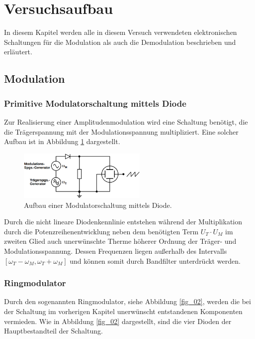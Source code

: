 \section{Versuchsaufbau}
\label{sec:Versuchaufbau}
In diesem Kapitel werden alle in diesem Versuch verwendeten elektronischen Schaltungen für die Modulation als auch die Demodulation beschrieben und erläutert.
\subsection{Modulation}
\subsubsection{Primitive Modulatorschaltung mittels Diode}
\label{sec:Primitive_Modulatorschaltung_mittels_Diode}
Zur Realisierung einer Amplitudenmodulation wird eine Schaltung benötigt, die die Trägerspannung mit der Modulationsspannung multipliziert. Eine solcher Aufbau ist in Abbildung \ref{fig_10} dargestellt.

\begin{figure}
    \centering
    \includegraphics[width=0.55\textwidth]{ressources/A10.png}
    \caption{Aufbau einer Modulatorschaltung mittels Diode\cite{skript}.}
    \label{fig_10}
\end{figure}

Durch die nicht lineare Diodenkennlinie entstehen während der Multiplikation durch die Potenzreihenentwicklung neben dem benötigten Term $U_T \cdot U_M$ im zweiten Glied auch unerwünschte Therme höherer Ordnung der Träger- und Modulationsspannung. Dessen Frequenzen liegen außerhalb des Intervalls $[\omega_T-\omega_M, \omega_T+\omega_M]$ und können somit durch Bandfilter unterdrückt werden.

\subsubsection{Ringmodulator}
\label{sec:Ringmodulator}
Durch den sogenannten Ringmodulator, siehe Abbildung \ref{fig_02}, werden die bei der Schaltung im vorherigen Kapitel unerwünscht entstandenen Komponenten vermieden. Wie in Abbildung \ref{fig_02} dargestellt, sind die vier Dioden der Hauptbestandteil der Schaltung. 

